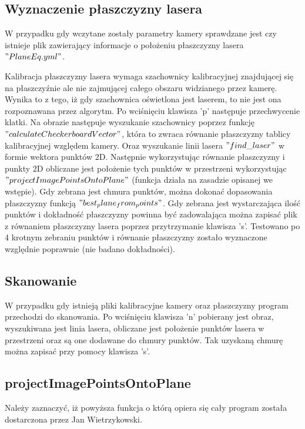 \documentclass[conference]{IEEEtran}
\begin{document}
\subsection{Wyznaczenie płaszczyzny lasera}

W przypadku gdy wczytane zostały parametry kamery sprawdzane jest czy istnieje plik zawierający informacje o położeniu płaszczyzny lasera $"PlaneEq.yml"$.

Kalibracja płaszczyzny lasera wymaga szachownicy kalibracyjnej znajdującej się na płaszczyźnie ale nie zajmującej całego obszaru widzianego przez kamerę. Wynika to z tego, iż gdy szachownica oświetlona jest laserem, to nie jest ona rozpoznawana przez algorytm.
Po wciśnięciu klawisza 'p' następuje przechwycenie klatki. Na obrazie następuje wyszukanie szachownicy poprzez funkcję $"calculateCheckerboardVector"$, która to zwraca równanie płaszczyzny tablicy kalibracyjnej względem kamery. Oraz wyszukanie linii lasera $"find\_laser"$ w formie wektora punktów 2D. Następnie wykorzystując równanie płaszczyzny i punkty 2D obliczane jest położenie tych punktów w przestrzeni wykorzystując $"projectImagePointsOntoPlane"$ (funkcja działa na zasadzie opisanej we wstępie). Gdy zebrana jest chmura punktów, można dokonać dopasowania płaszczyzny funkcją $"best_plane_from_points"$. Gdy zebrana jest wystarczająca ilość punktów i dokładność płaszczyzny powinna być zadowalająca można zapisać plik z równaniem płaszczyzny lasera poprzez przytrzymanie klawisza 's'.
Testowano po 4 krotnym zebraniu punktów i równanie płaszczyzny zostało wyznaczone względnie poprawnie (nie badano dokładności).

\subsection{Skanowanie}

W przypadku gdy istnieją pliki kalibracyjne kamery oraz płaszczyzny program przechodzi do skanowania. Po wciśnięciu klawisza 'n' pobierany jest obraz, wyszukiwana jest linia lasera, obliczane jest położenie punktów lasera w przestrzeni oraz są one dodawane do chmury punktów. Tak uzyskaną chmurę można zapisać przy pomocy klawisza 's'.

\subsection{projectImagePointsOntoPlane}

Należy zaznaczyć, iż powyższa funkcja o którą opiera się cały program została dostarczona przez Jan Wietrzykowski.
\end{document}
